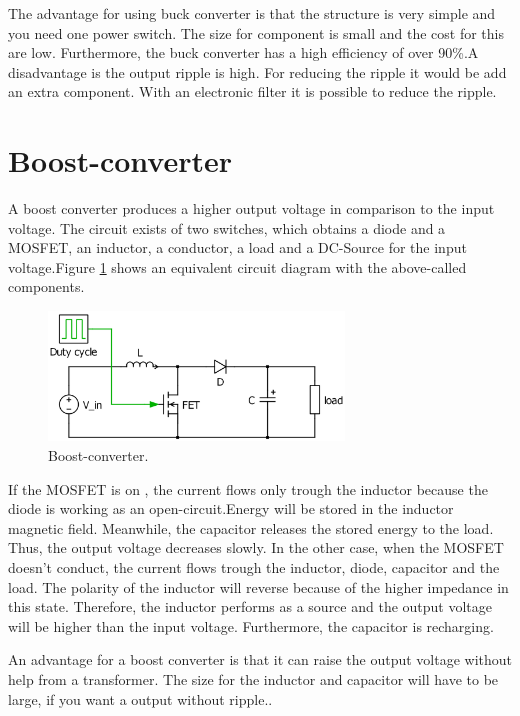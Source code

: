 The advantage for using buck converter is that the structure is very simple and you need one power switch. The size for component is small and the cost for this are low. Furthermore, the buck converter has a high efficiency of over 90\%.A disadvantage  is the output ripple is high. For reducing the ripple it would be add an extra component. With an electronic filter it is possible to reduce the ripple\cite{advantagebuck}.

\section{Boost-converter\label{Boost-C}}

A boost converter produces a higher output voltage in comparison to the input voltage. The circuit exists of two switches, which obtains a diode and a MOSFET, an inductor, a conductor, a load and a DC-Source for the input voltage.Figure \ref{Boost-converter} shows an equivalent circuit diagram with the above-called components. %

\begin{figure}[htbp]
	\begin{center}
		\includegraphics[width=0.7\textwidth]{../Pictures/Boost-converter}
		\caption{Boost-converter.}
		\label{Boost-converter}
	\end{center}	
\end{figure}

If the MOSFET is on , the current flows only trough the inductor because the diode  is working as an open-circuit.Energy will be stored in the inductor magnetic field. Meanwhile, the capacitor releases the stored energy to the load. Thus, the output voltage decreases slowly. In the other case, when the MOSFET doesn’t conduct, the current flows trough the inductor, diode, capacitor and the load. The polarity of the inductor will reverse because of the higher impedance in this state. Therefore, the inductor performs as a source and the output voltage will be higher than the input voltage. Furthermore, the capacitor is recharging\cite{circuitboost}.

An advantage for a boost converter is that it can raise the output voltage without help from a transformer. The size for the inductor and capacitor will have to be large, if you want a output without ripple.\cite{advantageboost}. %
 
